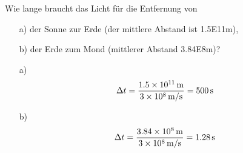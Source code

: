 

\begin{aufgabe}
Wie lange braucht das Licht für die Entfernung von 
\begin{itemize}
	\item[a)] der Sonne zur Erde (der mittlere Abstand ist \num{1.5E11}{m}),
	\item[b)] der Erde zum Mond (mittlerer Abstand \num{3.84E8}{m})?
\end{itemize}





\begin{loesung}
	\begin{itemize}
		\item[a)]
			\begin{equation*}
\Delta t = \frac{\SI{1.5E11}{m}}{\SI{3E8}{m/s}}= \SI{500}{s}
			\end{equation*}
		\item[b)]
			\begin{equation*}
\Delta t = \frac{\SI{3.84E8}{m}}{\SI{3E8}{m/s}}= \SI{1.28}{s}
			\end{equation*}
\end{itemize}
\end{loesung}
\end{aufgabe}
